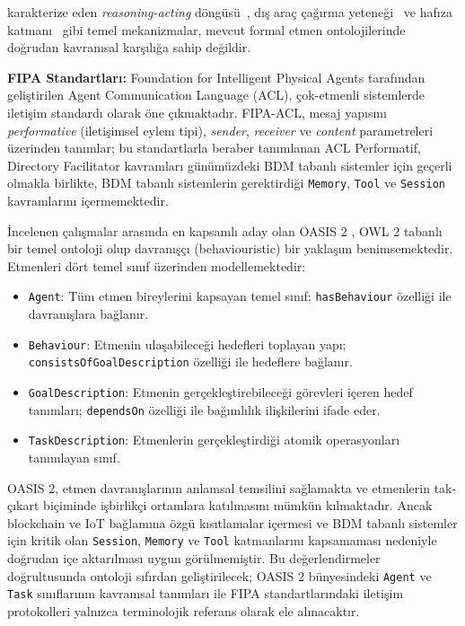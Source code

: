 \documentclass[10pt, a4paper, twocolumn]{article}
\begin{document}
karakterize eden \textit{reasoning-acting} döngüsü~\cite{yao2023react}, dış araç çağırma yeteneği~\cite{schick2023toolformer} ve hafıza katmanı~\cite{packer2023memgpt} gibi temel mekanizmalar, mevcut formal etmen ontolojilerinde doğrudan kavramsal karşılığa sahip değildir.

\textbf{FIPA Standartları:} Foundation for Intelligent Physical Agents \cite{fipa2002acl} tarafından geliştirilen Agent Communication Language (ACL), çok-etmenli sistemlerde iletişim standardı olarak öne çıkmaktadır. FIPA-ACL, mesaj yapısını \textit{performative} (iletişimsel eylem tipi), \textit{sender}, \textit{receiver} ve \textit{content} parametreleri üzerinden tanımlar;
bu standartlarla beraber tanımlanan ACL Performatif, Directory Facilitator kavramları günümüzdeki BDM tabanlı sistemler için geçerli olmakla birlikte, BDM tabanlı sistemlerin gerektirdiği \texttt{Memory}, \texttt{Tool} ve \texttt{Session} kavramlarını içermemektedir.

İncelenen çalışmalar arasında en kapsamlı aday olan OASIS 2 \cite{bella2023oasis2}, OWL 2 tabanlı bir temel ontoloji olup davranışçı (behaviouristic) bir yaklaşım benimsemektedir. Etmenleri dört temel sınıf üzerinden modellemektedir:

\begin{itemize}
    \item \texttt{Agent}: Tüm etmen bireylerini kapsayan temel sınıf; \texttt{hasBehaviour} özelliği ile davranışlara bağlanır.
    \item \texttt{Behaviour}: Etmenin ulaşabileceği hedefleri toplayan yapı; \texttt{consistsOfGoalDescription} özelliği ile hedeflere bağlanır.
    \item \texttt{GoalDescription}: Etmenin gerçekleştirebileceği görevleri içeren hedef tanımları; \texttt{dependsOn} özelliği ile bağımlılık ilişkilerini ifade eder.
    \item \texttt{TaskDescription}: Etmenlerin gerçekleştirdiği atomik operasyonları tanımlayan sınıf.
\end{itemize}

OASIS 2, etmen davranışlarının anlamsal temsilini sağlamakta ve etmenlerin tak-çıkart biçiminde işbirlikçi ortamlara katılmasını mümkün kılmaktadır. Ancak blockchain ve IoT bağlamına özgü kısıtlamalar içermesi ve BDM tabanlı sistemler için kritik olan \texttt{Session}, \texttt{Memory} ve \texttt{Tool} katmanlarını kapsamaması nedeniyle doğrudan içe aktarılması uygun görülmemiştir. Bu değerlendirmeler doğrultusunda ontoloji sıfırdan geliştirilecek; OASIS 2 bünyesindeki \texttt{Agent} ve \texttt{Task} sınıflarının kavramsal tanımları ile FIPA standartlarındaki iletişim protokolleri yalnızca terminolojik referans olarak ele alınacaktır.
\end{document}
